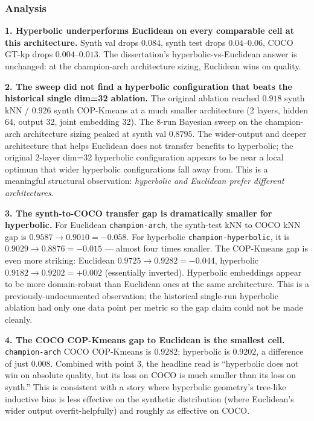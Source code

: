 \subsubsection{Analysis}

\textbf{1. Hyperbolic underperforms Euclidean on every comparable cell at this architecture.} Synth val drops $0.084$, synth test drops $0.04$--$0.06$, COCO GT-kp drops $0.004$--$0.013$. The dissertation's hyperbolic-vs-Euclidean answer is unchanged: at the champion-arch architecture sizing, Euclidean wins on quality.

\textbf{2. The sweep did not find a hyperbolic configuration that beats the historical single dim=32 ablation.} The original ablation reached $0.918$ synth kNN / $0.926$ synth COP-Kmeans at a much smaller architecture (2 layers, hidden 64, output 32, joint embedding 32). The 8-run Bayesian sweep on the champion-arch architecture sizing peaked at synth val $0.8795$. The wider-output and deeper architecture that helps Euclidean does not transfer benefits to hyperbolic; the original 2-layer dim=32 hyperbolic configuration appears to be near a local optimum that wider hyperbolic configurations fall away from. This is a meaningful structural observation: \emph{hyperbolic and Euclidean prefer different architectures}.

\textbf{3. The synth-to-COCO transfer gap is dramatically smaller for hyperbolic.} For Euclidean \texttt{champion-arch}, the synth-test kNN to COCO kNN gap is $0.9587 \rightarrow 0.9010 = -0.058$. For hyperbolic \texttt{champion-hyperbolic}, it is $0.9029 \rightarrow 0.8876 = -0.015$ --- almost four times smaller. The COP-Kmeans gap is even more striking: Euclidean $0.9725 \rightarrow 0.9282 = -0.044$, hyperbolic $0.9182 \rightarrow 0.9202 = +0.002$ (essentially inverted). Hyperbolic embeddings appear to be more domain-robust than Euclidean ones at the same architecture. This is a previously-undocumented observation; the historical single-run hyperbolic ablation had only one data point per metric so the gap claim could not be made cleanly.

\textbf{4. The COCO COP-Kmeans gap to Euclidean is the smallest cell.} \texttt{champion-arch} COCO COP-Kmeans is $0.9282$; hyperbolic is $0.9202$, a difference of just $0.008$. Combined with point 3, the headline read is ``hyperbolic does not win on absolute quality, but its loss on COCO is much smaller than its loss on synth.'' This is consistent with a story where hyperbolic geometry's tree-like inductive bias is less effective on the synthetic distribution (where Euclidean's wider output overfit-helpfully) and roughly as effective on COCO.

